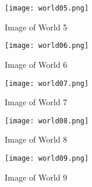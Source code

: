 \begin{figure}[H]
	\centering
	\texttt{[image: world05.png]}
	\caption{Image of World 5}
	\label{fig:world5}
\end{figure}

\begin{figure}[H]
	\centering
	\texttt{[image: world06.png]}
	\caption{Image of World 6}
	\label{fig:world6}
\end{figure}

\begin{figure}[H]
	\centering
	\texttt{[image: world07.png]}
	\caption{Image of World 7}
	\label{fig:world7}
\end{figure}

\begin{figure}[H]
	\centering
	\texttt{[image: world08.png]}
	\caption{Image of World 8}
	\label{fig:world8}
\end{figure}

\begin{figure}[H]
	\centering
	\texttt{[image: world09.png]}
	\caption{Image of World 9}
	\label{fig:world9}
\end{figure}
